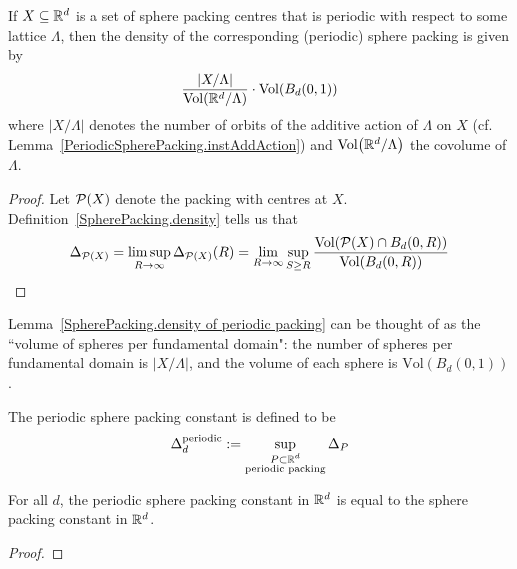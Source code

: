 \begin{lemma}\label{SpherePacking.density of periodic packing}\notready
  If $X \subseteq \mathbb{R}^d$ is a set of sphere packing centres that is periodic with respect to some lattice $\Lambda$, then the density of the corresponding (periodic) sphere packing is given by
  \begin{equation}
    \frac{\lvert {X/\Lambda} \rvert}{\mathrm{Vol}(\mathbb{R}^d / \Lambda)} \cdot \mathrm{Vol}(B_d(0,1))
    \label{eq:periodic_packing_density_formula}
  \end{equation}
  where %
  $\lvert X / \Lambda \rvert$ denotes the number of orbits of the additive action of $\Lambda$ on $X$ (cf. Lemma~\ref{PeriodicSpherePacking.instAddAction}) and $\operatorname{Vol}\!\left(\mathbb{R}^d / \Lambda\right)$ the covolume of $\Lambda$.
\end{lemma}
\begin{proof}
  Let $\mathcal{P}(X)$ denote the packing with centres at $X$. Definition~\ref{SpherePacking.density} tells us that
  \[
    \Delta_{\mathcal{P}(X)} = \limsup_{R \to \infty} \Delta_{\mathcal{P}(X)}(R) = \lim_{R \to \infty} \sup_{S \geq R} \frac{\operatorname{Vol}\!\left(\mathcal{P}(X) \cap B_d(0, R)\right)}{\operatorname{Vol}\!\left(B_d(0, R)\right)}
  \]
\end{proof}

\begin{remark}
  Lemma~\ref{SpherePacking.density of periodic packing} can be thought of as the ``volume of spheres per fundamental domain": the number of spheres per fundamental domain is $\lvert {X/\Lambda} \rvert$, and the volume of each sphere is $\mathrm{Vol}(B_d(0,1))$.
\end{remark}

\begin{definition}\label{def-Periodic-sphere-packing-constant}\notready
    The periodic sphere packing constant is defined to be
    $$ \Delta_{d}^{\text{periodic}} := \sup_{\substack{P \subset \mathbb{R}^d \\ \text{periodic packing}}} \Delta_P$$
\end{definition}

\begin{theorem}\label{periodic-packing-optimal}\notready
    For all $d$, the periodic sphere packing constant in $\mathbb{R}^d$ is equal to the sphere packing constant in $\mathbb{R}^d$.
\end{theorem}
\begin{proof}
\end{proof}


